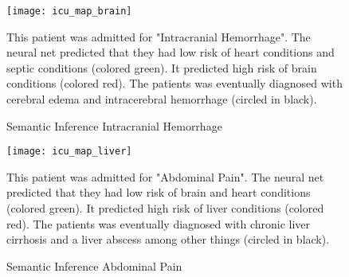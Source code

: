 {    %
    
    
    \begin{figure}
    \texttt{[image: icu\_map\_brain]}
    \caption{Semantic Inference Intracranial Hemorrhage}
    \vspace{12px}
    This patient was admitted for "Intracranial Hemorrhage".  The neural net predicted that they had low risk of heart conditions and septic conditions (colored green).  It predicted high risk of brain conditions (colored red).  The patients was eventually diagnosed with cerebral edema and intracerebral hemorrhage (circled in black).
    \label{fig:icu_map_brain}
    \end{figure}
    
    \begin{figure}
    \texttt{[image: icu\_map\_liver]}
    \caption{Semantic Inference Abdominal Pain}
    \vspace{12px}
    This patient was admitted for "Abdominal Pain".  The neural net predicted that they had low risk of brain and heart conditions (colored green).  It predicted high risk of liver conditions (colored red).  The patients was eventually diagnosed with chronic liver cirrhosis and a liver abscess among other things (circled in black).
    \label{fig:icu_map_liver}
    \end{figure}
}